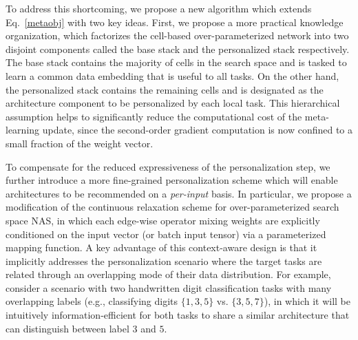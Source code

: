 To address this shortcoming, we propose a new algorithm which extends Eq.~\eqref{metaobj} with two key ideas. First, we propose a more practical knowledge organization, which factorizes the cell-based over-parameterized network into two disjoint components called the base stack and the personalized stack respectively. The base stack contains the majority of cells in the search space and is tasked to learn a common data embedding that is useful to all tasks. On the other hand, the personalized stack contains the remaining cells and is designated as the architecture component to be personalized by each local task. This hierarchical assumption helps to significantly reduce the computational cost of the meta-learning update, since the second-order gradient computation is now confined to a small fraction of the weight vector.

To compensate for the reduced expressiveness of the personalization step, we further introduce a more fine-grained personalization scheme which will enable architectures to be recommended on a \emph{per-input} basis. In particular, we propose a modification of the continuous relaxation scheme for over-parameterized search space NAS, in which each edge-wise operator mixing weights are explicitly conditioned on the input vector (or batch input tensor) via a parameterized mapping function. A key advantage of this context-aware design is that it implicitly addresses the personalization scenario where the target tasks are related through an overlapping mode of their data distribution. For example, consider a scenario with two handwritten digit classification tasks with many overlapping labels (e.g., classifying digits $\{1,3,5\}$ vs. $\{3,5,7\}$), in which it will be intuitively information-efficient for both tasks to share a similar architecture that can distinguish between label $3$ and $5$. 

